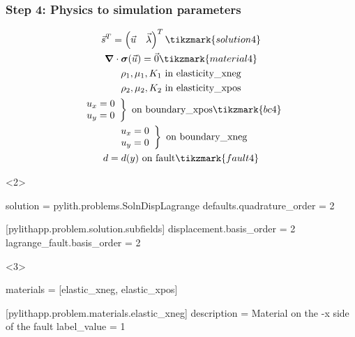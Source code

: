 \documentclass[aspectratio=169]{beamer}
\begin{document}
\begin{frame}[t,fragile]
  \frametitle{Step 4: Physics to simulation parameters}
  \summary{}

  \begin{minipage}[t]{0.35\textwidth}
    {\scriptsize
    \begin{gather*}
    \vec{s}^T = \left( \vec{u} \quad \vec{\lambda} \right)^T \tikzmark{solution4}\\
    \tensor{\nabla} \cdot \tensor{\sigma}(\vec{u}) = \vec{0} \tikzmark{material4} \\
    \rho_1, \mu_1, K_1 \text{ in elasticity\_xneg} \\ 
    \rho_2, \mu_2, K_2 \text{ in elasticity\_xpos} \\ 
    \left. \begin{array}{c} u_x = 0 \\ u_y = 0 \end{array}\right\} \text{ on boundary\_xpos} \tikzmark{bc4}\\
    \left. \begin{array}{c} u_x = 0 \\ u_y = 0 \end{array}\right\} \text{ on boundary\_xneg} \\
    d = d(y) \text{ on fault} \tikzmark{fault4}
    \end{gather*}}
  \end{minipage}
  \hfill
  \begin{minipage}[t]{0.60\textwidth}
    \begin{onlyenv}<2>
      \begin{cfgcode}
        solution = pylith.problems.SolnDispLagrange
        defaults.quadrature_order = 2
        
        [pylithapp.problem.solution.subfields]
        displacement.basis_order = 2
        lagrange_fault.basis_order = 2
      \end{cfgcode}
    \end{onlyenv}
    \begin{onlyenv}<3>
      \begin{cfgcode}
        materials = [elastic_xneg, elastic_xpos]

        [pylithapp.problem.materials.elastic_xneg]
        description = Material on the -x side of the fault
        label_value = 1


\end{cfgcode}
\end{onlyenv}
\end{minipage}
\end{frame}
\end{document}
